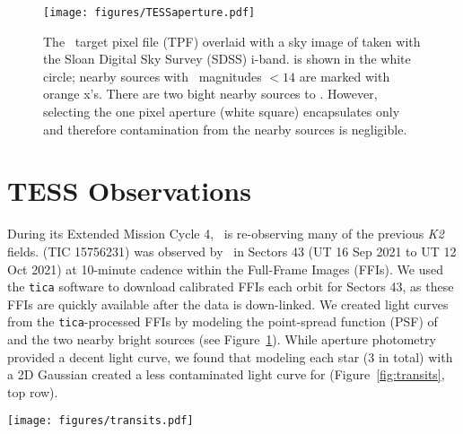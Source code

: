 \documentclass[twocolumn]{aastex631}
\begin{document}
\begin{figure}[!ht]
\begin{center}
\texttt{[image: figures/TESSaperture.pdf]}
\caption{The \tess\ target pixel file (TPF) overlaid with a sky image of \sname taken with the Sloan Digital Sky Survey (SDSS) i-band. \sname is shown in the white circle; nearby sources with \tess\ magnitudes $< 14$ are marked with orange x's. There are two bight nearby sources to \sname. However, selecting the one pixel aperture (white square) encapsulates only \sname and therefore contamination from the nearby sources is negligible.} \label{fig:tpf}
\end{center}
\end{figure}

\section{TESS Observations} \label{sec:observations}

During its Extended Mission Cycle 4, \tess\ is re-observing many of the previous \textit{K2} fields. \sname (TIC 15756231) was observed by \tess\ in Sectors 43 (UT 16 Sep 2021 to UT 12 Oct 2021) at 10-minute cadence within the Full-Frame Images (FFIs). We used the \texttt{tica} \citep{fausnaugh20} software to download calibrated FFIs each orbit for Sectors 43, as these FFIs are quickly available after the data is down-linked. We created light curves from the \texttt{tica}-processed FFIs by modeling the point-spread function (PSF) of \sname and the two nearby bright sources (see Figure~\ref{fig:tpf}). While aperture photometry provided a decent light curve, we found that modeling each star (3 in total) with a 2D Gaussian created a less contaminated light curve for \sname (Figure~\ref{fig:transits}, top row). 




\begin{figure*}[!ht]
\begin{center}
\texttt{[image: figures/transits.pdf]}
\caption{\sname extracted light curve from the \texttt{tica}-processed full-frame images, with transits of \allplanets highlighted by color. Top row: extracted light curve with over plotted with our best-fit GP model for stellar variability (blue). Middle row: the \tess\ light curve with the stellar variability removed by our model. Bottom rows: zoomed-in regions around the visible transits during the first orbit (third row) and second orbit (last row) from \tess\ Sector 43.} 
\label{fig:transits}
\end{center}
\end{figure*}
\end{document}
